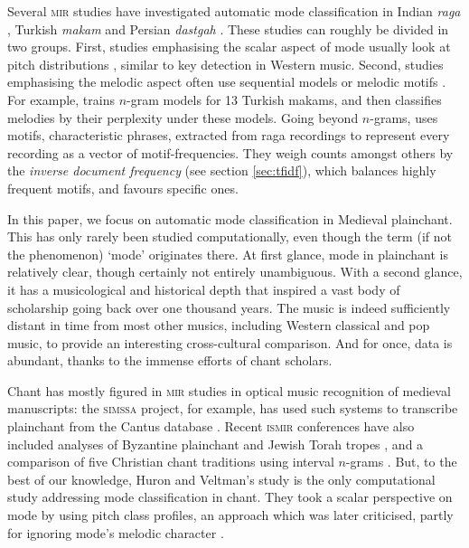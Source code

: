 \documentclass{article}
\begin{document}
Several \textsc{mir} studies have investigated automatic mode classification in Indian \emph{raga} \cite{Chordia2007,Gulati2016a}, Turkish \emph{makam} \cite{Unal2012,Atalay2020} and Persian \emph{dastgah} \cite{Abdoli2011,Heydarian2019}.
These studies can roughly be divided in two groups.
First, studies emphasising the scalar aspect of mode usually look at pitch distributions \cite{Chordia2007,Atalay2020,Heydarian2019}, similar to key detection in Western music.
Second, studies emphasising the melodic aspect often use sequential models or melodic motifs \cite{Unal2012,Gulati2016a}.
For example, \cite{Unal2012} trains $n$-gram models for 13 Turkish makams, and then classifies melodies by their perplexity under these models.
Going beyond {$n$-grams}, \cite{Gulati2016a} uses motifs, characteristic phrases, extracted from raga recordings to represent every recording as a vector of motif-frequencies.
They weigh counts amongst others by the \emph{inverse document frequency} (see section \ref{sec:tfidf}), which balances highly frequent motifs, and favours specific ones.


In this paper, we focus on automatic mode classification in Medieval plainchant.
This has only rarely been studied computationally, even though the term (if not the phenomenon) `mode' originates there.
At first glance, mode in plainchant is relatively clear, though certainly not entirely unambiguous.
With a second glance, it has a musicological and historical depth that inspired a vast body of scholarship going back over one thousand years.
The music is indeed sufficiently distant in time from most other musics, including Western classical and pop music, to provide an interesting cross-cultural comparison.
And for once, data is abundant, thanks to the immense efforts of chant scholars.


Chant has mostly figured in \textsc{mir} studies in optical music recognition of medieval manuscripts:
the \textsc{simssa} project, for example, has used such systems
to transcribe plainchant from the Cantus database \cite{Helsen2014}.
Recent \textsc{ismir} conferences have also included analyses of Byzantine plainchant \cite{Panteli2013} and Jewish Torah tropes \cite{vanKranenburg2011}, and a comparison of five Christian chant traditions using interval $n$-grams \cite{vanKranenburg2017}.
But, to the best of our knowledge, Huron and Veltman's study \cite{Huron2006a} is the only computational study addressing mode classification in chant.
They took a scalar perspective on mode by using pitch class profiles, an approach which was later criticised, partly for ignoring mode's melodic character \cite{Wiering2006}.
\end{document}
